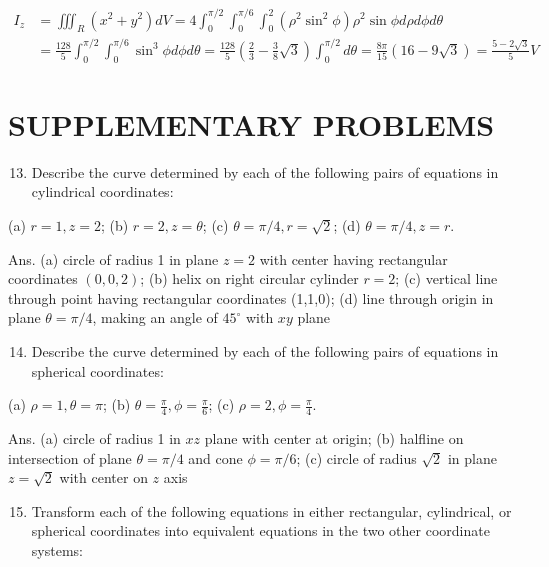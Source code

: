\documentclass[10pt]{article}
\begin{document}
$$
\begin{aligned}
I_{z} & =\iiint_{R}\left(x^{2}+y^{2}\right) d V=4 \int_{0}^{\pi / 2} \int_{0}^{\pi / 6} \int_{0}^{2}\left(\rho^{2} \sin ^{2} \phi\right) \rho^{2} \sin \phi d \rho d \phi d \theta \\
& =\frac{128}{5} \int_{0}^{\pi / 2} \int_{0}^{\pi / 6} \sin ^{3} \phi d \phi d \theta=\frac{128}{5}\left(\frac{2}{3}-\frac{3}{8} \sqrt{3}\right) \int_{0}^{\pi / 2} d \theta=\frac{8 \pi}{15}(16-9 \sqrt{3})=\frac{5-2 \sqrt{3}}{5} V
\end{aligned}
$$

\section*{SUPPLEMENTARY PROBLEMS}
\begin{enumerate}
  \setcounter{enumi}{12}
  \item Describe the curve determined by each of the following pairs of equations in cylindrical coordinates:
\end{enumerate}

(a) $r=1, z=2$; (b) $r=2, z=\theta$; (c) $\theta=\pi / 4, r=\sqrt{2}$; (d) $\theta=\pi / 4, z=r$.

Ans. (a) circle of radius 1 in plane $z=2$ with center having rectangular coordinates $(0,0,2)$; (b) helix on right circular cylinder $r=2$; (c) vertical line through point having rectangular coordinates (1,1,0); (d) line through origin in plane $\theta=\pi / 4$, making an angle of $45^{\circ}$ with $x y$ plane

\begin{enumerate}
  \setcounter{enumi}{13}
  \item Describe the curve determined by each of the following pairs of equations in spherical coordinates:
\end{enumerate}

(a) $\rho=1, \theta=\pi$; (b) $\theta=\frac{\pi}{4}, \phi=\frac{\pi}{6}$; (c) $\rho=2, \phi=\frac{\pi}{4}$.

Ans. (a) circle of radius 1 in $x z$ plane with center at origin; (b) halfline on intersection of plane $\theta=\pi / 4$ and cone $\phi=\pi / 6$; (c) circle of radius $\sqrt{2}$ in plane $z=\sqrt{2}$ with center on $z$ axis

\begin{enumerate}
  \setcounter{enumi}{14}
  \item Transform each of the following equations in either rectangular, cylindrical, or spherical coordinates into equivalent equations in the two other coordinate systems:
\end{enumerate}
\end{document}
